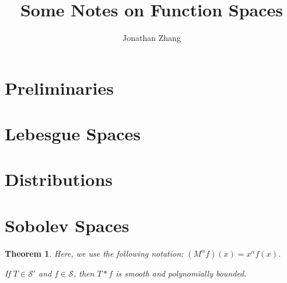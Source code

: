 \documentclass[letterpaper,twoside,12pt]{article}
\theoremstyle{mystyle}
\newtheorem{theorem}{Theorem}[section]
\newcommand{\ScS}{\mathcal S}
\begin{document}
\title{\vspace{-2\baselineskip} 
Some Notes on Function Spaces 
}
\author{Jonathan Zhang}
\date{}
\maketitle


\section{Preliminaries}
\section{Lebesgue Spaces}
\section{Distributions}
\section{Sobolev Spaces}
\begin{tcolorbox}[colback=red!5!white,colframe=red!75!black]
  \begin{theorem}
    Here, we use the following notation: $\left( {{M^\alpha }f} \right)\left( x \right) = {x^\alpha }f\left( x \right)$.
    
    If $T\in \ScS'$ and $f \in \ScS$, then $T\ast f$ is smooth and polynomially bounded. 
  \end{theorem}
  \end{tcolorbox}
  
  
\end{document}
